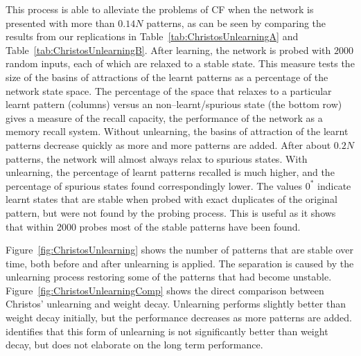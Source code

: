 This process is able to alleviate the problems of CF when the network is presented with more than $0.14N$ patterns, as can be seen by comparing the results from our replications in Table~\ref{tab:ChristosUnlearningA} and Table~\ref{tab:ChristosUnlearningB}.    After learning, the network is probed with $2000$ random inputs, each of which are relaxed to a stable state. This measure tests the size of the basins of attractions of the learnt patterns as a percentage of the network state space.  The percentage of the space that relaxes to a particular learnt pattern (columns) versus an non--learnt/spurious state (the bottom row) gives a measure of the recall capacity, the performance of the network as a memory recall system. Without unlearning, the basins of attraction of the learnt patterns decrease quickly as more and more patterns are added. After about $0.2N$ patterns, the network will almost always relax to spurious states. With unlearning, the percentage of learnt patterns recalled is much higher, and the percentage of spurious states found correspondingly lower.  The values $0^{*}$ indicate learnt states that are stable when probed with exact duplicates of the original pattern, but were not found by the probing process.  This is useful as it shows that within 2000 probes most of the stable patterns have been found. 

\begin{table}
	\scalebox{0.8}{}
	\caption{Percentage retrieval for individual patterns in a   network having learnt patterns until it is overloaded, with no unlearning. 2000 probes used to generate percentages with $0^{*}$ indicating patterns that were stable but were not found during sampling.}
	\label{tab:ChristosUnlearningA}
\end{table}

\begin{table}
	\scalebox{0.8}{}
	\caption{Percentage retrieval for individual patterns in a   network having learnt patterns until it is overloaded, with unlearning applied after each new item (unlearning 50 probes with an unlearning constant of $\unlearningConst =-0.1$). 2000 probes used to generate percentages with $0^{*}$ patterns that were stable but were not found during sampling.}
	\label{tab:ChristosUnlearningB}
\end{table}

Figure~\ref{fig:ChristosUnlearning} shows the number of patterns that are stable over time, both before and after unlearning is applied.  The separation is caused by the unlearning process restoring some of the patterns that had become unstable. Figure~\ref{fig:ChristosUnlearningComp} shows the direct comparison between Christos' unlearning and weight decay.  Unlearning performs slightly better than weight decay initially, but the performance decreases as more patterns are added.  \citet{Christos96} identifies that this form of unlearning is not significantly better than weight decay, but does not elaborate on the long term performance.  

